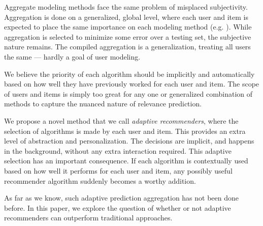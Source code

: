 
Aggregate modeling methods face the same problem of misplaced subjectivity. 
Aggregation is done on a generalized, global level,
where each user and item is expected to place the same importance on each modeling method
(e.g. \cite{Aslam2001, Claypool1999, Bell2007, Carmel2009, Bender2005}).
While aggregation is selected to minimize some error over a testing set,
the subjective nature remains. The compiled aggregation is a generalization,
treating all users the same --- hardly a goal of user modeling.

We believe the priority of each algorithm should be implicitly and automatically
based on how well they have previously worked for each user and item.
The scope of users and items is simply too great for any one or generalized combination
of methods to capture the nuanced nature of relevance prediction.

We propose a novel method that we call \emph{adaptive recommenders}, where 
the selection of algorithms is made by each user and item.
This provides an extra level of abstraction and personalization.
The decisions are implicit, and happens in the background, without any extra interaction required.
This adaptive selection has an important consequence. 
If each algorithm is contextually used based on how well it performs for each user and item,
any possibly useful recommender algorithm suddenly becomes a worthy addition.

As far as we know, such adaptive prediction aggregation has not been done before.
In this paper, we explore the question of whether or not
adaptive recommenders can outperform traditional approaches.
